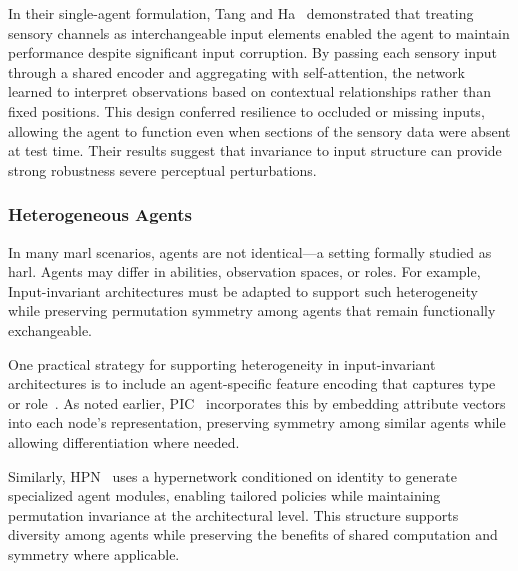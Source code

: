 In their single-agent formulation, Tang and Ha~\cite{tang2021} demonstrated 
that treating sensory channels as interchangeable input elements enabled 
the agent to maintain performance despite significant input corruption. 
By passing each sensory input through a shared encoder and aggregating 
with self-attention, the network learned to interpret observations based 
on contextual relationships rather than fixed positions. 
This design conferred resilience to occluded or missing inputs, 
allowing the agent to function even when sections of the sensory 
data were absent at test time. Their results suggest that invariance 
to input structure can provide strong robustness
severe perceptual perturbations.

\begin{comment}
    They propose a very similar question:
        "Sensory substitution refers to the brain’s ability to use one sensory modality 
        (e.g., touch) to supply environmental information normally gathered by 
        another sense (e.g., vision)."
    - Extremely similar to my interest in sensory degradation.
    - However, in their experiments they instead demonstrate an invariance in a singular
    observational domain. (They take a 2d image, chunk it and shuffle.)
\end{comment}

\subsubsection{Heterogeneous Agents}
In many \gls{marl} scenarios, agents are not identical—a setting formally studied 
as \gls{harl}. Agents may differ in abilities, observation spaces, or roles. 
For example, Input-invariant architectures must be adapted to support such heterogeneity 
while preserving permutation symmetry among agents that remain functionally exchangeable.

One practical strategy for supporting heterogeneity in input-invariant architectures 
is to include an agent-specific feature encoding that captures type or 
role~\cite{liu2020b,hao2022,hao2023}. As noted earlier, PIC~\cite{liu2020b}
incorporates this by embedding attribute vectors into each node's representation, 
preserving symmetry among similar agents while allowing differentiation where needed.

Similarly, HPN~\cite{hao2023} uses a hypernetwork conditioned on 
identity to generate specialized agent modules, enabling tailored policies 
while maintaining permutation invariance at the architectural level. 
This structure supports diversity among agents while preserving the 
benefits of shared computation and symmetry where applicable.

